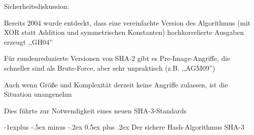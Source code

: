 \documentclass[a4paper]{article}
\makeatletter
\renewcommand{\subsection}{\@startsection{subsection}{2}{0mm}%
 {-1explus -.5ex minus -.2ex}%
 {0.5ex plus .2ex}%
 {\normalfont\normalsize\bfseries}}
\makeatother
\begin{document}
\begin{multicols}{3}
\begin{itemize*}
\begin{itemize*}
                  \item Sicherheitsdiskussion:
                  \begin{itemize*} \item Bereits 2004 wurde entdeckt, dass eine vereinfachte Version des Algorithmus (mit XOR statt Addition und symmetrischen Konstanten) hochkorrelierte Ausgaben erzeugt ,,GH04'' \item Für rundenreduzierte Versionen von SHA-2 gibt es Pre-Image-Angriffe, die schneller sind als Brute-Force, aber sehr unpraktisch (z.B. ,,AGM09'') \item Auch wenn Größe und Komplexität derzeit keine Angriffe zulassen, ist die Situation unangenehm \item Dies führte zur Notwendigkeit eines neuen SHA-3-Standards \end{itemize*}
            \end{itemize*}
      \end{itemize*}


      \subsection{Der sichere Hash-Algorithmus
            SHA-3}


\end{multicols}
\end{document}
